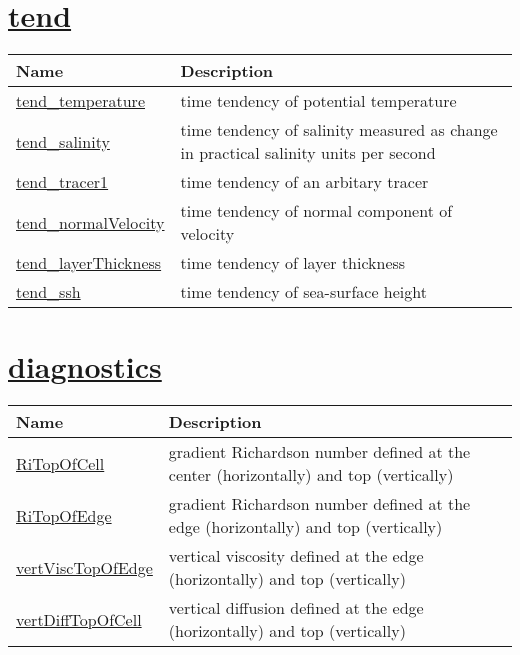 \section[tend]{\hyperref[sec:var_sec_tend]{tend}}
\label{sec:var_tab_tend}

{\small
\begin{center}
\begin{longtable}{| p{2.0in} | p{4.0in} |}
	\hline
	{\bf Name} & {\bf Description} \\
	\hline
	\hyperref[subsec:var_sec_tend_tend_temperature]{tend\_temperature} & time tendency of potential temperature \\
	\hline
	\hyperref[subsec:var_sec_tend_tend_salinity]{tend\_salinity} & time tendency of salinity measured as change in practical salinity units per second \\
	\hline
	\hyperref[subsec:var_sec_tend_tend_tracer1]{tend\_tracer1} & time tendency of an arbitary tracer \\
	\hline
	\hyperref[subsec:var_sec_tend_tend_normalVelocity]{tend\_normalVelocity} & time tendency of normal component of velocity \\
	\hline
	\hyperref[subsec:var_sec_tend_tend_layerThickness]{tend\_layerThickness} & time tendency of layer thickness \\
	\hline
	\hyperref[subsec:var_sec_tend_tend_ssh]{tend\_ssh} & time tendency of sea-surface height \\
	\hline
\end{longtable}
\end{center}
}
\section[diagnostics]{\hyperref[sec:var_sec_diagnostics]{diagnostics}}
\label{sec:var_tab_diagnostics}

{\small
\begin{center}
\begin{longtable}{| p{2.0in} | p{4.0in} |}
	\hline
	{\bf Name} & {\bf Description} \\
	\hline
	\hyperref[subsec:var_sec_diagnostics_RiTopOfCell]{RiTopOfCell} & gradient Richardson number defined at the center (horizontally) and top (vertically) \\
	\hline
	\hyperref[subsec:var_sec_diagnostics_RiTopOfEdge]{RiTopOfEdge} & gradient Richardson number defined at the edge (horizontally) and top (vertically) \\
	\hline
	\hyperref[subsec:var_sec_diagnostics_vertViscTopOfEdge]{vertViscTopOfEdge} & vertical viscosity defined at the edge (horizontally) and top (vertically) \\
	\hline
	\hyperref[subsec:var_sec_diagnostics_vertDiffTopOfCell]{vertDiffTopOfCell} & vertical diffusion defined at the edge (horizontally) and top (vertically) \\
	\hline
\end{longtable}
\end{center}
}
